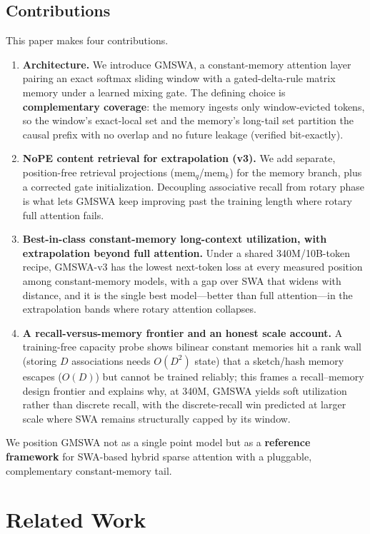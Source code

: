 \documentclass[letterpaper]{article} %
\begin{document}
\subsection{Contributions}
This paper makes four contributions.
\begin{enumerate}
  \item \textbf{Architecture.} We introduce GMSWA, a constant-memory attention layer pairing an exact softmax sliding window with a gated-delta-rule matrix memory under a learned mixing gate. The defining choice is \textbf{complementary coverage}: the memory ingests only window-evicted tokens, so the window's exact-local set and the memory's long-tail set partition the causal prefix with no overlap and no future leakage (verified bit-exactly).
  \item \textbf{NoPE content retrieval for extrapolation (v3).} We add separate, position-free retrieval projections ($\mathrm{mem}_q$/$\mathrm{mem}_k$) for the memory branch, plus a corrected gate initialization. Decoupling associative recall from rotary phase is what lets GMSWA keep improving past the training length where rotary full attention fails.
  \item \textbf{Best-in-class constant-memory long-context utilization, with extrapolation beyond full attention.} Under a shared 340M/10B-token recipe, GMSWA-v3 has the lowest next-token loss at every measured position among constant-memory models, with a gap over SWA that widens with distance, and it is the single best model---better than full attention---in the extrapolation bands where rotary attention collapses.
  \item \textbf{A recall-versus-memory frontier and an honest scale account.} A training-free capacity probe shows bilinear constant memories hit a rank wall (storing $D$ associations needs $O(D^2)$ state) that a sketch/hash memory escapes ($O(D)$) but cannot be trained reliably; this frames a recall--memory design frontier and explains why, at 340M, GMSWA yields soft utilization rather than discrete recall, with the discrete-recall win predicted at larger scale where SWA remains structurally capped by its window.
\end{enumerate}

We position GMSWA not as a single point model but as a \textbf{reference framework} for SWA-based hybrid sparse attention with a pluggable, complementary constant-memory tail.

\section{Related Work}
\end{document}
